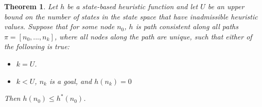 \documentclass[letterpaper]{article}
\newtheorem{theorem}{Theorem}
\begin{document}
\begin{theorem}%
Let $h$ be a state-based heuristic function and let $U$ be an upper bound on the number of states in the state space that have inadmissible heuristic values. Suppose that for some node $n_0$, $h$ is path consistent along all paths $\pi=[n_0, ..., n_k]$, where all nodes along the path are unique, such that either of the following is true:
\begin{itemize}
    \item $k = U$.
    \item $k < U$, $n_k$ is a goal, and $h(n_k) = 0$
\end{itemize}
Then $h(n_0) \leq h^*(n_0)$.
\label{the:inadmissible-detection}
\end{theorem}
\end{document}
